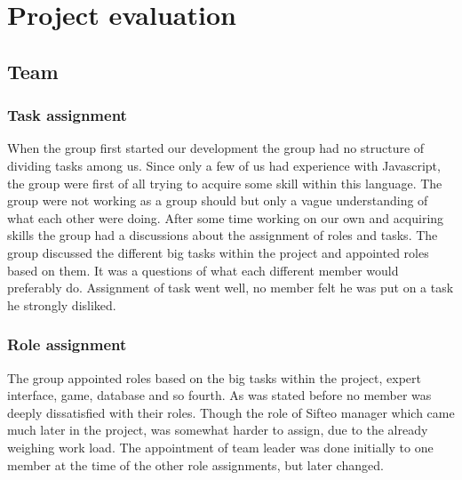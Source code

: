 \chapter{Project evaluation}

\section{Team}

\subsection*{Task assignment}

When the group first started our development the group had no structure of dividing tasks among us. Since only a few of us had experience with Javascript, the group were first of all trying to acquire some skill within this language. The group were not working as a group should but only a vague understanding of what each other were doing. After some time working on our own and acquiring skills the group had a discussions about the assignment of roles and tasks. The group discussed the different big tasks within the project and appointed roles based on them. It was a questions of what each different member would preferably do. Assignment of task went well, no member felt he was put on a task he strongly disliked.

\subsection*{Role assignment}

The group appointed roles based on the big tasks within the project, expert interface, game, database and so fourth. As was stated before no member was deeply dissatisfied with their roles. Though the role of Sifteo manager which came much later in the project, was somewhat harder to assign, due to the already weighing work load. The appointment of team leader was done initially to one member at the time of the other role assignments, but later changed. 

